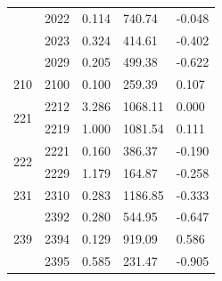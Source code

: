 \documentclass[12pt,a4paper]{article}
\begin{document}
{\begin{longtable}{@{}cllll@{}}
	& 2022                                         & 0.114                           & 740.74                           & -0.048                           \\ \cline{2-5} 
	& 2023                                         & 0.324                           & 414.61                           & -0.402                           \\ \cline{2-5} 
	& 2029                                         & 0.205                           & 499.38                           & -0.622                           \\ \hline
	210                                             & 2100                                         & 0.100                           & 259.39                           & 0.107                            \\ \hline
	\multirow{2}{*}{221}                            & 2212                                         & 3.286                           & 1068.11                          & 0.000                            \\ \cline{2-5} 
	& 2219                                         & 1.000                           & 1081.54                          & 0.111                            \\ \hline
	\multirow{2}{*}{222}                            & 2221                                         & 0.160                           & 386.37                           & -0.190                           \\ \cline{2-5} 
	& 2229                                         & 1.179                           & 164.87                           & -0.258                           \\ \hline
	231                                             & 2310                                         & 0.283                           & 1186.85                          & -0.333                           \\ \hline
	\multirow{3}{*}{239}                            & 2392                                         & 0.280                           & 544.95                           & -0.647                           \\ \cline{2-5} 
	& 2394                                         & 0.129                           & 919.09                           & 0.586                            \\ \cline{2-5} 
	& 2395                                         & 0.585                           & 231.47                           & -0.905                           \\ \hline

\end{longtable}}
\end{document}
